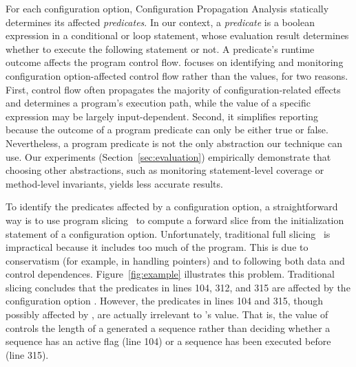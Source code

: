 For each configuration option, Configuration Propagation Analysis statically determines
its affected \textit{predicates}. In our context, a \textit{predicate}
is a boolean expression in a conditional or loop statement, whose evaluation result
determines whether to execute the following statement or not.
A predicate's runtime outcome affects the program control flow.
\ourtool focuses on identifying and monitoring 
configuration option-affected control flow
rather than the values, for two reasons. First, control flow 
often propagates the majority of configuration-related effects
and determines a program's execution path, while
the value of a specific expression may be largely input-dependent.
Second, it simplifies reporting because the outcome of a program predicate can only be
either true or false.  Nevertheless, a program predicate is not the only
abstraction our technique can use. 
Our experiments (Section~\ref{sec:evaluation})
empirically demonstrate that choosing other abstractions,
such as monitoring statement-level coverage
or method-level invariants, yields less accurate results.


To identify the predicates affected by a configuration option, a straightforward
way is to use program slicing~\cite{Horwitz:1988} to compute
a forward slice from the initialization statement of a
configuration option. Unfortunately, traditional full slicing~\cite{Horwitz:1988}
is impractical
because it includes too much of the program.  This is due to conservatism
(for example, in handling pointers) and to following both data and control
dependences.
Figure~\ref{fig:example} illustrates
this problem.  Traditional slicing concludes that the predicates
in lines 104, 312, and 315 are affected by the configuration option .
However, the predicates in lines 104 and 315, though possibly
affected by , are actually irrelevant
to 's value. That is, the value of 
controls the length of a generated a sequence rather
than deciding whether a sequence has an active flag (line 104) or
a sequence has been executed before (line 315).

